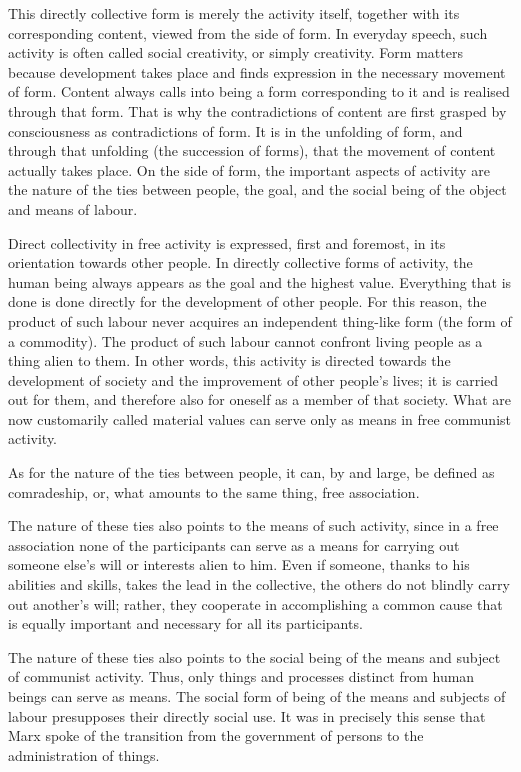 \documentclass[12pt,a4paper,openany]{book}
\begin{document}
This directly collective form is merely the activity itself, together with its corresponding content, viewed from the side of form. In everyday speech, such activity is often called social creativity, or simply creativity. Form matters because development takes place and finds expression in the necessary movement of form. Content always calls into being a form corresponding to it and is realised through that form. That is why the contradictions of content are first grasped by consciousness as contradictions of form. It is in the unfolding of form, and through that unfolding (the succession of forms), that the movement of content actually takes place. On the side of form, the important aspects of activity are the nature of the ties between people, the goal, and the social being of the object and means of labour.

Direct collectivity in free activity is expressed, first and foremost, in its orientation towards other people. In directly collective forms of activity, the human being always appears as the goal and the highest value. Everything that is done is done directly for the development of other people. For this reason, the product of such labour never acquires an independent thing-like form (the form of a commodity). The product of such labour cannot confront living people as a thing alien to them. In other words, this activity is directed towards the development of society and the improvement of other people’s lives; it is carried out for them, and therefore also for oneself as a member of that society. What are now customarily called material values can serve only as means in free communist activity.

As for the nature of the ties between people, it can, by and large, be defined as comradeship, or, what amounts to the same thing, free association.

The nature of these ties also points to the means of such activity, since in a free association none of the participants can serve as a means for carrying out someone else’s will or interests alien to him. Even if someone, thanks to his abilities and skills, takes the lead in the collective, the others do not blindly carry out another’s will; rather, they cooperate in accomplishing a common cause that is equally important and necessary for all its participants.

The nature of these ties also points to the social being of the means and subject of communist activity. Thus, only things and processes distinct from human beings can serve as means. The social form of being of the means and subjects of labour presupposes their directly social use. It was in precisely this sense that Marx spoke of the transition from the government of persons to the administration of things.
\end{document}
